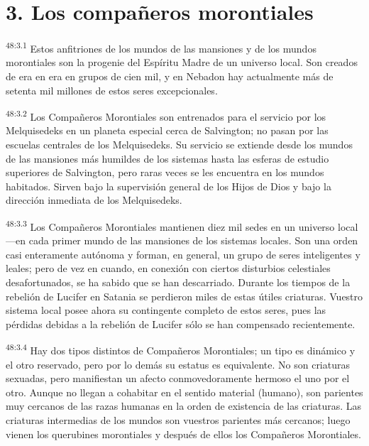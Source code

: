 \section*{3. Los compañeros morontiales}
\par
\textsuperscript{48:3.1} Estos anfitriones de los mundos de las mansiones y de los mundos morontiales son la progenie del Espíritu Madre de un universo local. Son creados de era en era en grupos de cien mil, y en Nebadon hay actualmente más de setenta mil millones de estos seres excepcionales.

\par
\textsuperscript{48:3.2} Los Compañeros Morontiales son entrenados para el servicio por los Melquisedeks en un planeta especial cerca de Salvington; no pasan por las escuelas centrales de los Melquisedeks. Su servicio se extiende desde los mundos de las mansiones más humildes de los sistemas hasta las esferas de estudio superiores de Salvington, pero raras veces se les encuentra en los mundos habitados. Sirven bajo la supervisión general de los Hijos de Dios y bajo la dirección inmediata de los Melquisedeks.

\par
\textsuperscript{48:3.3} Los Compañeros Morontiales mantienen diez mil sedes en un universo local ---en cada primer mundo de las mansiones de los sistemas locales. Son una orden casi enteramente autónoma y forman, en general, un grupo de seres inteligentes y leales; pero de vez en cuando, en conexión con ciertos disturbios celestiales desafortunados, se ha sabido que se han descarriado. Durante los tiempos de la rebelión de Lucifer en Satania se perdieron miles de estas útiles criaturas. Vuestro sistema local posee ahora su contingente completo de estos seres, pues las pérdidas debidas a la rebelión de Lucifer sólo se han compensado recientemente.

\par
\textsuperscript{48:3.4} Hay dos tipos distintos de Compañeros Morontiales; un tipo es dinámico y el otro reservado, pero por lo demás su estatus es equivalente. No son criaturas sexuadas, pero manifiestan un afecto conmovedoramente hermoso el uno por el otro. Aunque no llegan a cohabitar en el sentido material (humano), son parientes muy cercanos de las razas humanas en la orden de existencia de las criaturas. Las criaturas intermedias de los mundos son vuestros parientes más cercanos; luego vienen los querubines morontiales y después de ellos los Compañeros Morontiales.

